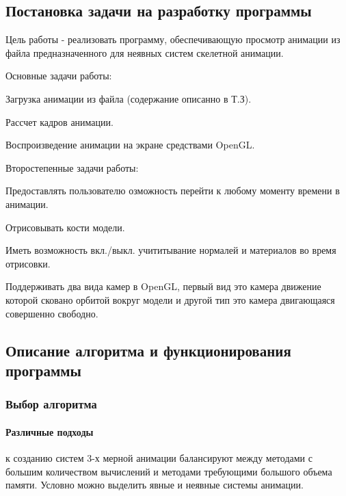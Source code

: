 \subsection{Постановка задачи на разработку программы}
    Цель работы - реализовать программу, обеспечивающую просмотр анимации из файла предназначенного для неявных систем скелетной анимации.
    
\bigskip

Основные задачи работы:

\smallskip
\begin{my_enumerate}
\item Загрузка анимации из файла (содержание описанно в Т.З).
\item Рассчет кадров анимации.
\item Воспроизведение анимации на экране средствами OpenGL.
\end{my_enumerate}
	
Второстепенные задачи работы:
\begin{my_enumerate}
\item Предоставлять пользователю озможность перейти к любому моменту времени в анимации.
\item Отрисовывать кости модели.
\item Иметь возможность вкл./выкл. учититывание нормалей и материалов во время отрисовки.
\item Поддерживать два вида камер в OpenGL, первый вид это камера движение которой сковано орбитой вокруг модели и другой тип это камера двигающаяся совершенно свободно.
\end{my_enumerate}


\subsection{Описание алгоритма и функционирования программы}


\subsubsection{Выбор алгоритма}

\paragraph{Различные подходы}
к созданию систем 3-х мерной анимации балансируют между методами с большим количеством вычислений и методами требующими большого объема памяти. Условно можно выделить явные и неявные системы анимации.

